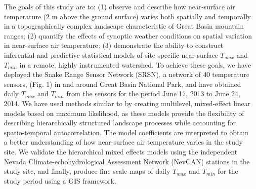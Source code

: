 \documentclass{ametsoc}
\begin{document}
The goals of this study are to:
(1) observe and describe how near-surface air temperature (2 m above the ground surface) 
varies  both spatially and temporally in a topographically complex landscape characteristic 
of Great Basin mountain ranges; 
(2) quantify the effects of synoptic weather conditions on spatial 
variation in near-surface air temperature; 
(3) demonstrate the ability to construct inferential and predictive statistical models of 
site-specific near-surface $T_{max}$ and $T_{min}$ in a remote, highly instrumented 
watershed.
To achieve these goals, we have deployed the Snake Range Sensor Network (SRSN), 
a network of 40 temperature sensors, (Fig. 1) in and around Great Basin National Park, and 
have obtained daily $T_{max}$ and $T_{min}$ from the sensors for the period June 17, 
2013 to June 24, 2014.  We have used methods similar to \citet{Fridley2009} by creating 
multilevel, mixed-effect linear models based on maximum likelihood, as these models 
provide the flexibility of describing hierarchically structured landscape processes 
while accounting for spatio-temporal autocorrelation.  The model coefficients are interpreted 
to obtain a better understanding of how near-surface air temperature varies in the study site.  
We validate the hierarchical mixed effects models using the independent Nevada 
Climate-echohydrological Assessment Network (NevCAN) stations in the study site, and finally, 
produce fine scale maps of daily $T_{max}$ and $T_{min}$ for the study period 
using a GIS framework.

\end{document}
